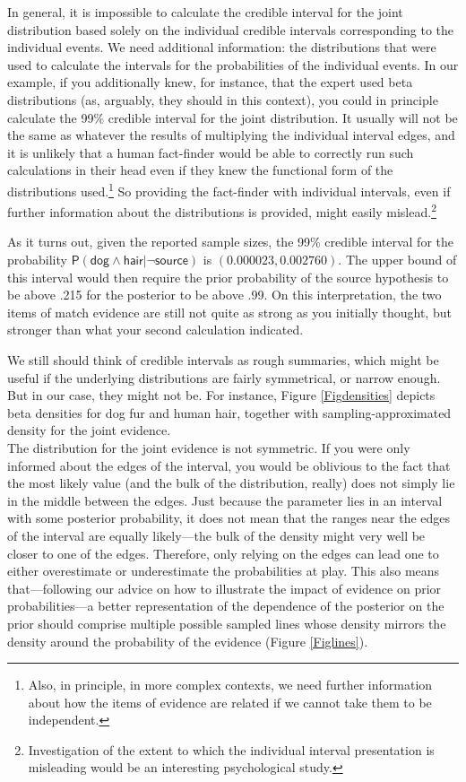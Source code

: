\documentclass[
  10pt,
  dvipsnames,enabledeprecatedfontcommands]{scrartcl}
\newcommand{\s}[1]{\mbox{$\mathsf{#1}$}}
\begin{document}
In general, it is impossible to calculate the credible interval for the
joint distribution based solely on the individual credible intervals
corresponding to the individual events. We need additional information:
the distributions that were used to calculate the intervals for the
probabilities of the individual events. In our example, if you
additionally knew, for instance, that the expert used beta distributions
(as, arguably, they should in this context), you could in principle
calculate the 99\% credible interval for the joint distribution. It
usually will not be the same as whatever the results of multiplying the
individual interval edges, and it is unlikely that a human fact-finder
would be able to correctly run such calculations in their head even if
they knew the functional form of the distributions used.\footnote{Also,
  in principle, in more complex contexts, we need further information
  about how the items of evidence are related if we cannot take them to
  be independent.} So providing the fact-finder with individual
intervals, even if further information about the distributions is
provided, might easily mislead.\footnote{Investigation of the extent to
  which the individual interval presentation is misleading would be an
  interesting psychological study.}

As it turns out, given the reported sample sizes, the 99\% credible
interval for the probability
\(\mathsf{P}(\s{dog}\wedge \s{hair} \vert \neg \s{source})\) is
\((0.000023, 0.002760)\). The upper bound of this interval would then
require the prior probability of the source hypothesis to be above .215
for the posterior to be above .99. On this interpretation, the two items
of match evidence are still not quite as strong as you initially
thought, but stronger than what your second calculation indicated.

We still should think of credible intervals as rough summaries, which
might be useful if the underlying distributions are fairly symmetrical,
or narrow enough. But in our case, they might not be. For instance,
Figure \ref{Figdensities} depicts beta densities for dog fur and human
hair, together with sampling-approximated density for the joint
evidence.\\
The distribution for the joint evidence is not symmetric. If you were
only informed about the edges of the interval, you would be oblivious to
the fact that the most likely value (and the bulk of the distribution,
really) does not simply lie in the middle between the edges. Just
because the parameter lies in an interval with some posterior
probability, it does not mean that the ranges near the edges of the
interval are equally likely---the bulk of the density might very well be
closer to one of the edges. Therefore, only relying on the edges can
lead one to either overestimate or underestimate the probabilities at
play. This also means that---following our advice on how to illustrate
the impact of evidence on prior probabilities---a better representation
of the dependence of the posterior on the prior should comprise multiple
possible sampled lines whose density mirrors the density around the
probability of the evidence (Figure \ref{Figlines}).
\end{document}
